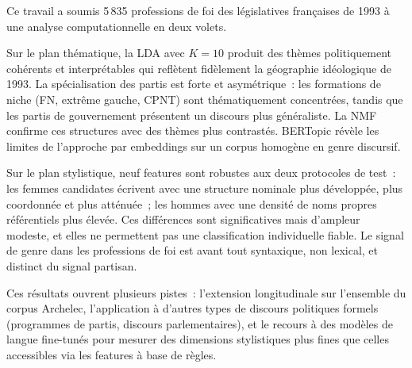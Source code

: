 \documentclass{article}
\begin{document}
Ce travail a soumis 5\,835 professions de foi des législatives françaises de
1993 à une analyse computationnelle en deux volets.

Sur le plan thématique, la LDA avec $K=10$ produit des thèmes politiquement
cohérents et interprétables qui reflètent fidèlement la géographie idéologique
de 1993. La spécialisation des partis est forte et asymétrique~: les formations
de niche (FN, extrême gauche, CPNT) sont thématiquement concentrées, tandis
que les partis de gouvernement présentent un discours plus généraliste.
La NMF confirme ces structures avec des thèmes plus contrastés.
BERTopic révèle les limites de l'approche par embeddings sur un corpus homogène
en genre discursif.

Sur le plan stylistique, neuf features sont robustes aux deux protocoles de
test~: les femmes candidates écrivent avec une structure nominale plus développée,
plus coordonnée et plus atténuée~; les hommes avec une densité de noms propres
référentiels plus élevée. Ces différences sont significatives mais d'ampleur
modeste, et elles ne permettent pas une classification individuelle fiable.
Le signal de genre dans les professions de foi est avant tout syntaxique,
non lexical, et distinct du signal partisan.

Ces résultats ouvrent plusieurs pistes~: l'extension longitudinale sur l'ensemble
du corpus Archelec, l'application à d'autres types de discours politiques
formels (programmes de partis, discours parlementaires), et le recours à des
modèles de langue fine-tunés pour mesurer des dimensions stylistiques plus
fines que celles accessibles via les features à base de règles.



\end{document}
